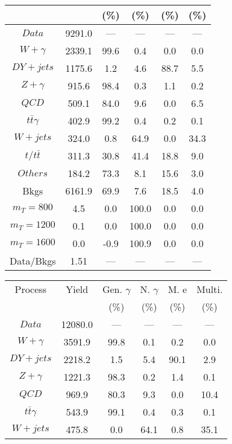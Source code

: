 \begin{figure}
\begin{minipage}[c]{0.32\textwidth}
{\begin{tabular}{cccccc}
 &  & (\%) & (\%) & (\%) & (\%)  \\
\hline
                                                                      $ Data $ &  9291.0 &  --- &  --- &  --- &  ---\\
$ W+\gamma $ &  2339.1 &  99.6 &  0.4 &  0.0 &  0.0\\
$ DY+jets $ &  1175.6 &  1.2 &  4.6 &  88.7 &  5.5\\
$ Z+\gamma $ &  915.6 &  98.4 &  0.3 &  1.1 &  0.2\\
$ QCD $ &  509.1 &  84.0 &  9.6 &  0.0 &  6.5\\
$ t\bar{t}\gamma $ &  402.9 &  99.2 &  0.4 &  0.2 &  0.1\\
$ W+jets $ &  324.0 &  0.8 &  64.9 &  0.0 &  34.3\\
$ t/t\bar{t} $ &  311.3 &  30.8 &  41.4 &  18.8 &  9.0\\
$ Others $ &  184.2 &  73.3 &  8.1 &  15.6 &  3.0\\
Bkgs &  6161.9 &  69.9 &  7.6 &  18.5 &  4.0\\
$ m_{T} = 800 $ &  4.5 &  0.0 &  100.0 &  0.0 &  0.0\\
$ m_{T} = 1200 $ &  0.1 &  0.0 &  100.0 &  0.0 &  0.0\\
$ m_{T} = 1600 $ &  0.0 &  -0.9 &  100.9 &  0.0 &  0.0\\
Data/Bkgs &  1.51 &  --- &  --- &  --- &  ---\\
\hline
\end{tabular}
}
\end{minipage}
\begin{minipage}[c]{0.32\textwidth}
\centering
\tiny{
\begin{tabular}{cccccc}
\hline
Process & Yield & Gen. $\gamma$ & N. $\gamma$ & M. e & Multi. \\
 &  & (\%) & (\%) & (\%) & (\%)  \\
\hline
                                                                      $ Data $ &  12080.0 &  --- &  --- &  --- &  ---\\
$ W+\gamma $ &  3591.9 &  99.8 &  0.1 &  0.2 &  0.0\\
$ DY+jets $ &  2218.2 &  1.5 &  5.4 &  90.1 &  2.9\\
$ Z+\gamma $ &  1221.3 &  98.3 &  0.2 &  1.4 &  0.1\\
$ QCD $ &  969.9 &  80.3 &  9.3 &  0.0 &  10.4\\
$ t\bar{t}\gamma $ &  543.9 &  99.1 &  0.4 &  0.3 &  0.1\\
$ W+jets $ &  475.8 &  0.0 &  64.1 &  0.8 &  35.1\\

\end{tabular}}
\end{minipage}
\end{figure}
